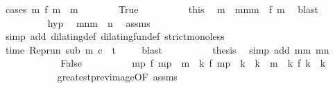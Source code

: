 \begin{isabellebody}
\ {\isacharparenleft}cases\ {\isacartoucheopen}{\isasymexists}m\ f\ m\ {\isacharequal}\ m{\isacartoucheclose}{\isacharparenright}\isanewline
\ \ \ \ \ \ \isamarkupfalse%
\ True\isanewline
\ \ \ \ \ \ \ \ \isamarkupfalse%
\ this\ \isamarkupfalse%
\ m\ \ mm{}{\isacharcolon}{\isacartoucheopen}m\ {\isacharequal}\ f\ m\ \isamarkupfalse%
\ blast\isanewline
\ \ \ \ \ \ \ \ \isamarkupfalse%
\ hyp\ \isamarkupfalse%
\ m{}n{\isacharcolon}{\isacartoucheopen}m\ {\isacharless}\ n{\isacartoucheclose}\ \isamarkupfalse%
\ assms{\isacharparenleft}{}{\isacharparenright}\isanewline
\ \ \ \ \ \ \ \ \ \ \isamarkupfalse%
\ {\isacharparenleft}simp\ add{\isacharcolon}\ dilating{\isacharunderscore}def\ dilating{\isacharunderscore}fun{\isacharunderscore}def\ strict{\isacharunderscore}mono{\isacharunderscore}less{\isacharparenright}\isanewline
\ \ \ \ \ \ \ \ \isamarkupfalse%
\ {\isacartoucheopen}time\ {\isacharparenleft}{\isacharparenleft}Rep{\isacharunderscore}run\ sub{\isacharparenright}\ m\ c{\isacharparenright}\ {\isacharless}\ t{\isacartoucheclose}\ \isamarkupfalse%
\ {\isacharasterisk}\ \isamarkupfalse%
\ blast\isanewline
\ \ \ \ \ \ \ \ \isamarkupfalse%
\ {\isacharquery}thesis\ \isamarkupfalse%
\ {\isacharparenleft}simp\ add{\isacharcolon}\ mm{}\ m{}n\ {\isacharasterisk}{\isacharasterisk}{\isacharparenright}\isanewline
\ \ \ \ \isamarkupfalse%
\isanewline
\ \ \ \ \ \ \isamarkupfalse%
\ False\isanewline
\ \ \ \ \ \ \ \ \isamarkupfalse%
\ {\isacartoucheopen}{\isasymexists}m\isactrlsub p{\isachardot}\ f\ m\isactrlsub p\ {\isacharless}\ m\ {\isasymand}\ {\isacharparenleft}{\isasymforall}k{\isachardot}\ f\ m\isactrlsub p\ {\isacharless}\ k\ {\isasymand}\ k\ {\isasymle}\ m\ {\isasymlongrightarrow}\ {\isacharparenleft}{\isasymnexists}k\ f\ k\ {\isacharequal}\ k{\isacharparenright}{\isacharparenright}{\isacartoucheclose}\isanewline
\ \ \ \ \ \ \ \ \ \ \isamarkupfalse%
\ greatest{\isacharunderscore}prev{\isacharunderscore}image{\isacharbrackleft}OF\ assms{\isacharbrackright}\ \isamarkupfalse%

\end{isabellebody}
